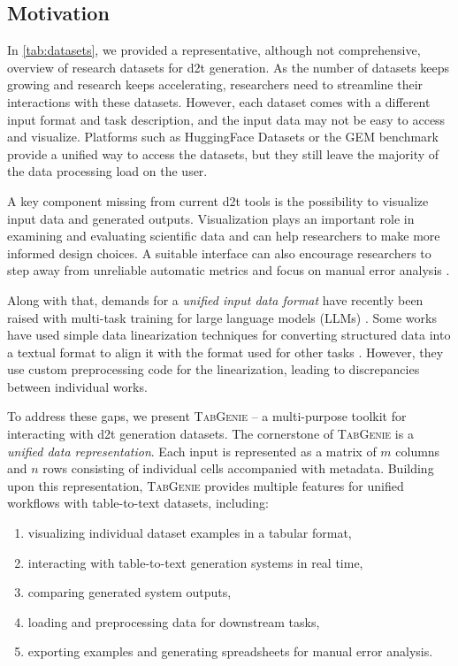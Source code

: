 \subsection{Motivation}
\label{sec:tabgenie:motivation}
In \autoref{tab:datasets}, we provided a representative, although not comprehensive, overview of research datasets for \ac{d2t} generation. As the number of datasets keeps growing and research keeps accelerating, researchers need to streamline their interactions with these datasets. However, each dataset comes with a different input format and task description, and the input data may not be easy to access and visualize.  Platforms such as HuggingFace Datasets \cite{lhoest2021datasets} or the GEM benchmark \cite{gehrmannGEMBenchmarkNatural2021}  provide a unified way to access the datasets, but they still leave the majority of the data processing load on the user.

A key component missing from current \ac{d2t} tools is the possibility to visualize input data and generated outputs. Visualization plays an important role in examining and evaluating scientific data \cite{Kehrer2013VisualizationAV} and can help researchers to make more informed design choices. A suitable interface can also encourage researchers to step away from unreliable automatic metrics \cite{gehrmannRepairingCrackedFoundation2022} and focus on manual error analysis \cite{van_miltenburg_underreporting_2021,van_miltenburg_barriers_2023}.

Along with that, demands for a \textit{unified input data format} have recently been raised with multi-task training for large language models (LLMs) \citep[\textit{inter alia}]{sanh2021multitask,scao2022bloom,ouyang2022TrainingLM}. Some works have used simple data linearization techniques for converting structured data into a textual format to align it with the format used for other tasks \cite{xieUnifiedSKGUnifyingMultiTasking2022,tang2022mvp}. However, they use custom preprocessing code for the linearization, leading to discrepancies between individual works.

To address these gaps, we present \textsc{TabGenie} -- a multi-purpose toolkit for interacting with \ac{d2t} generation datasets. The cornerstone of \textsc{TabGenie} is a \emph{unified data representation}. Each input is represented as a matrix of $m$ columns and $n$ rows consisting of individual cells accompanied with metadata. Building upon this representation, \textsc{TabGenie} provides multiple features for unified workflows with table-to-text datasets, including:
\begin{enumerate}
    \item visualizing individual dataset examples in a tabular format,
    \item interacting with table-to-text generation systems in real time,
    \item comparing generated system outputs,
    \item loading and preprocessing data for downstream tasks,
    \item exporting examples and generating spreadsheets for manual error analysis.
\end{enumerate}

